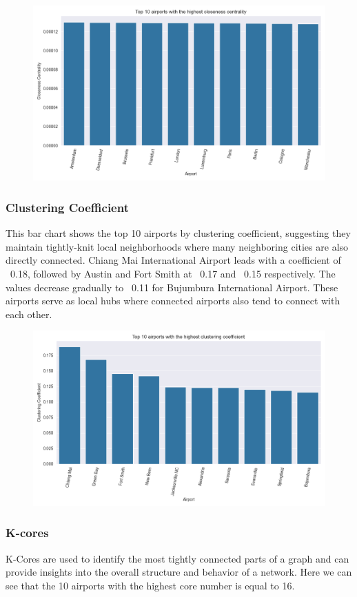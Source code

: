 \documentclass[12pt]{article}
\begin{document}
    \begin{figure}[H]
        \centering
        \includegraphics[width=0.8\linewidth]{img/closeness_centrality}
    \end{figure}

    \subsubsection{Clustering Coefficient}
    This bar chart shows the top 10 airports by clustering coefficient, suggesting they maintain tightly-knit local neighborhoods where many neighboring cities are also directly connected. Chiang Mai International Airport leads with a coefficient of ~0.18, followed by Austin and Fort Smith at ~0.17 and ~0.15 respectively. The values decrease gradually to ~0.11 for Bujumbura International Airport. These airports serve as local hubs where connected airports also tend to connect with each other.

    \begin{figure}[H]
        \centering
        \includegraphics[width=0.8\linewidth]{img/clustering_coefficient}
    \end{figure}

    \subsubsection{K-cores}
    K-Cores are used to identify the most tightly connected parts of a graph and can provide insights into the overall structure and behavior of a network. Here we can see that the 10 airports with the highest core number is equal to 16.
\end{document}
